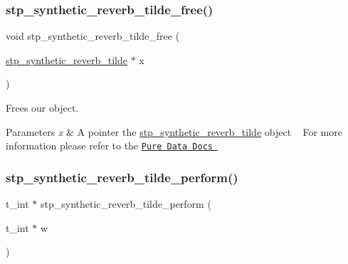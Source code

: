 \subsubsection{\texorpdfstring{stp\+\_\+synthetic\+\_\+reverb\+\_\+tilde\+\_\+free()}{stp\_synthetic\_reverb\_tilde\_free()}}
{\footnotesize\ttfamily void stp\+\_\+synthetic\+\_\+reverb\+\_\+tilde\+\_\+free (\begin{DoxyParamCaption}\item[{\hyperlink{structstp__synthetic__reverb__tilde}{stp\+\_\+synthetic\+\_\+reverb\+\_\+tilde} $\ast$}]{x }\end{DoxyParamCaption})\hspace{0.3cm}{\ttfamily [related]}}



Frees our object. ~\newline
 


\begin{DoxyParams}{Parameters}
{\em x} & A pointer the \hyperlink{structstp__synthetic__reverb__tilde}{stp\+\_\+synthetic\+\_\+reverb\+\_\+tilde} object ~\newline
 For more information please refer to the \href{https://github.com/pure-data/externals-howto}{\tt Pure Data Docs } ~\newline
 \\
\hline
\end{DoxyParams}
\mbox{\label{structstp__synthetic__reverb__tilde_ab35deab6d15a334c87f6781f899f149b}} 
\subsubsection{\texorpdfstring{stp\+\_\+synthetic\+\_\+reverb\+\_\+tilde\+\_\+perform()}{stp\_synthetic\_reverb\_tilde\_perform()}}
{\footnotesize\ttfamily t\+\_\+int $\ast$ stp\+\_\+synthetic\+\_\+reverb\+\_\+tilde\+\_\+perform (\begin{DoxyParamCaption}\item[{t\+\_\+int $\ast$}]{w }\end{DoxyParamCaption})\hspace{0.3cm}{\ttfamily [related]}}



